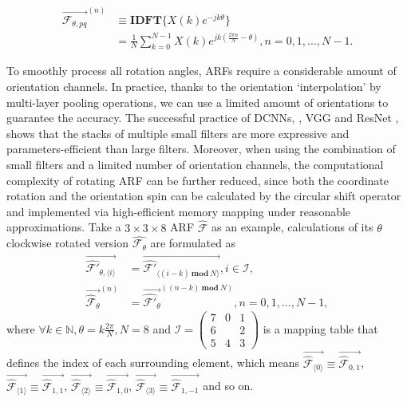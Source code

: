 \documentclass[10pt,twocolumn,letterpaper]{article}
\begin{document}
        \begin{equation}
            \begin{aligned}
            \overrightarrow{\mathcal{F}_{\theta, pq}}^{(n)} &\equiv \mathbf{IDFT}\{X(k)e^{-j k \theta}\} \\
                    &= \frac{1}{N}\sum_{k=0}^{N-1}X(k)e^{j k (\frac{2\pi n}{N} - \theta) }, {\scriptstyle n=0,1,...,N-1}.
            \end{aligned}
        \label{eq:Spin2}
        \end{equation}

        To smoothly process all rotation angles, ARFs require a considerable amount of orientation channels. In practice, thanks to the orientation `interpolation' by multi-layer pooling operations, we can use a limited amount of orientations to guarantee the accuracy. The successful practice of DCNNs, \eg, VGG \cite{Simonyan2014} and ResNet \cite{He2015, He2016}, shows that the stacks of multiple small filters are more expressive and parameters-efficient than large filters. Moreover, when using the combination of small filters and a limited number of orientation channels, the computational complexity of rotating ARF can be further reduced, since both the coordinate rotation and the orientation spin can be calculated by the circular shift operator and implemented via high-efficient memory mapping under reasonable approximations. Take a $3\times3\times8$ ARF $\hat{\mathcal{F}}$ as an example, calculations of its $\theta$ clockwise rotated version $\hat{\mathcal{F}_{\theta}}$ are formulated as
        \begin{equation}
            \begin{aligned}
                \overrightarrow{\hat{\mathcal{F}'}_{\theta, \langle i \rangle}} &= \overrightarrow{\hat{\mathcal{F}'}_{\langle (i-k)\
                \mathbf{mod}\ N \rangle}}, {\scriptstyle i \in \mathcal{I}}, \\
                \overrightarrow{\hat{\mathcal{F}}_{\theta}}^{(n)} &= \overrightarrow{\hat{\mathcal{F}'}_{\theta}}^{((n-k)\
                \mathbf{mod}\ N)}, {\scriptstyle n=0,1,...,N-1},
            \end{aligned}
            \label{eq:SmallARF}
        \end{equation}
        where $\forall{k} \in \mathbb{N}, \theta = k \frac{2\pi}{N}, N = 8$ and $\mathcal{I} = \left(\begin{smallmatrix}7&0&1\\6&
        &2\\5&4&3\end{smallmatrix}\right)$ is a mapping table that defines the index of each surrounding element, which means
        $\overrightarrow{\hat{\mathcal{F}}_{\langle 0 \rangle}} \equiv \overrightarrow{\hat{\mathcal{F}}_{0,1}}$,
        $\overrightarrow{\hat{\mathcal{F}}_{\langle 1 \rangle}} \equiv \overrightarrow{\hat{\mathcal{F}}_{1,1}}$,
        $\overrightarrow{\hat{\mathcal{F}}_{\langle 2 \rangle}} \equiv \overrightarrow{\hat{\mathcal{F}}_{1,0}}$,
        $\overrightarrow{\hat{\mathcal{F}}_{\langle 3 \rangle}} \equiv \overrightarrow{\hat{\mathcal{F}}_{1,-1}}$ and so on.
\end{document}
